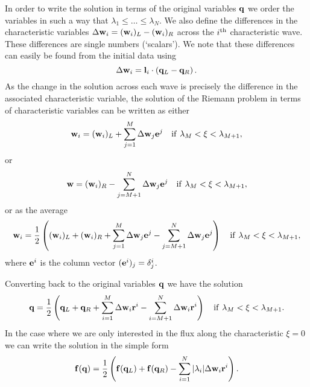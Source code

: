 \documentclass{article}
\begin{document}
In order to write the solution in terms of the original variables
${\bf q}$ we order the variables in such a way  that $\lambda_1 \leq \dots \leq
\lambda_N$. We also define the differences in the characteristic
variables $\Delta {\bf w}_i = ({\bf w}_i)_L - ({\bf w}_i)_R$ across
the $i^{{\rm th}}$ characteristic wave. These differences are single
numbers (`scalars'). We note that these differences can easily be
found from the initial data using
\begin{equation}
  \label{dw}
  \Delta {\bf w}_i = {\bf l}_i \cdot \left( {\bf q}_L - {\bf q}_R
  \right). 
\end{equation}
\noindent As the change in the solution across each wave is precisely
the difference in the associated characteristic variable, the solution
of the Riemann problem in terms of characteristic variables can be
written as either
\begin{equation}
  \label{lsrpsol1}
  {\bf w}_i = ({\bf w}_i)_L + \sum_{j=1}^M \Delta {\bf w}_j {\bf e}^j \quad
  {\rm if}\ \lambda_M < \xi < \lambda_{M+1},
\end{equation}
\noindent or 
\begin{equation}
  \label{lsrpsol2}
  {\bf w} = ({\bf w}_i)_R - \sum_{j=M+1}^N \Delta {\bf w}_j {\bf e}^j
  \quad {\rm if}\ \lambda_M < \xi < \lambda_{M+1},
\end{equation}
\noindent or as the average
\begin{equation}
  \label{lsrpsol3}
  {\bf w}_i = \frac{1}{2} \left( ({\bf w}_i)_L + ({\bf w}_i)_R +
  \sum_{j=1}^M \Delta 
  {\bf w}_j {\bf e}^j - \sum_{j=M+1}^N \Delta {\bf w}_j {\bf e}^j 
  \right) \quad {\rm if}\ \lambda_M < \xi < \lambda_{M+1},
\end{equation}
\noindent where ${\bf e}^i$ is the column vector $({\bf e}^i)_j =
\delta^i_j$. 

Converting back to the original variables ${\bf q}$ we have the
solution
\begin{equation}
  \label{lsrpsol4}
  {\bf q} = \frac{1}{2} \left( {\bf q}_L + {\bf q}_R + \sum_{i=1}^M \Delta
  {\bf w}_i {\bf r}^i - \sum_{i=M+1}^N \Delta {\bf w}_i {\bf r}^i
  \right) \quad {\rm if}\ \lambda_M < \xi < \lambda_{M+1}.
\end{equation} 
\noindent In the case where we are only interested in the flux
along the characteristic $\xi = 0$ we can write the solution in the
simple form
\begin{equation}
  \label{lsrpsol6}
  {\bf f}({\bf q}) = \frac{1}{2} \left( {\bf f}({\bf q}_L) + {\bf f}({\bf
  q}_R) - \sum_{i=1}^N | \lambda_i | \Delta {\bf w}_i {\bf r}^i \right).
\end{equation} 
\end{document}
